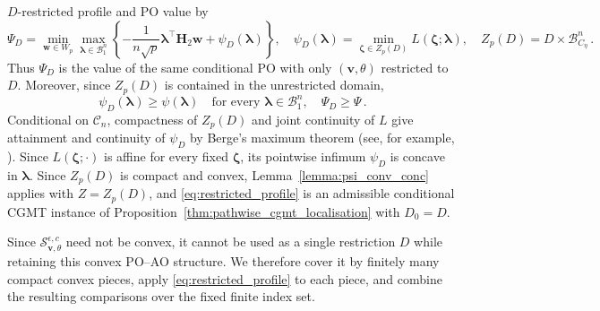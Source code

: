 \documentclass{article}
\theoremstyle{definition}
\newcommand*{\bb}{\boldsymbol}
\def\bw {\bb{w}}
\def\bH {\bb{H}}
\def\bv{\bb{v}}
\def\bH{\bb{H}}
\def\blambda{\bb{\lambda}}
\begin{document}
\begin{bibunit}
$D$-restricted profile and PO value by
\begin{equation}
\label{eq:restricted_profile}
     \Psi_D
    =
    \underset{\bw\in W_p}{\min}
    \underset{\blambda\in\mathcal B^n_1}{\max}
    \left\{
        -\frac1{n\sqrt p}\blambda^\top\bH_2\bw
        +
        \psi_D(\blambda)
    \right\}, \quad
     \psi_D(\blambda)
    =
    \underset{\bb\zeta\in Z_p(D)}{\min}
    L(\bb\zeta;\blambda), \quad
    Z_p(D)
    =
    D\times\mathcal B^n_{C_\eta}
    \,.
\end{equation}
Thus $\Psi_D$ is the value of the same conditional PO with only
$(\bv,\theta)$ restricted to $D$.
Moreover,
since $Z_p(D)$ is contained in the unrestricted domain,
$$
    \psi_D(\blambda)\geq\psi(\blambda)
    \quad\text{for every }\blambda\in\mathcal B^n_1,
    \quad
    \Psi_D\geq\Psi \,.
$$
Conditional on $\mathcal C_n$, compactness of $Z_p(D)$ and joint
continuity of $L$ give attainment and continuity of $\psi_D$ by Berge's maximum
theorem (see, for example,
\citealt[][Theorem~17.31.1]{aliprantis+et+al:2006}). Since
$L(\bb\zeta;\cdot)$ is affine for every fixed $\bb\zeta$, its pointwise
infimum $\psi_D$ is concave in $\blambda$. Since $Z_p(D)$ is compact and
convex, Lemma~\ref{lemma:psi_conv_conc} applies with $Z=Z_p(D)$, and
\eqref{eq:restricted_profile} is an admissible conditional CGMT instance
of Proposition~\ref{thm:pathwise_cgmt_localisation} with $D_0=D$. 

Since $\mathcal S_{\bv,\theta}^{\epsilon,c}$ need not be convex, it cannot
be used as a single restriction $D$ while retaining this convex PO--AO
structure. We therefore cover it by finitely many compact convex
pieces, apply \eqref{eq:restricted_profile} to each piece, and combine the
resulting comparisons over the fixed finite index set.


\end{bibunit}
\end{document}
